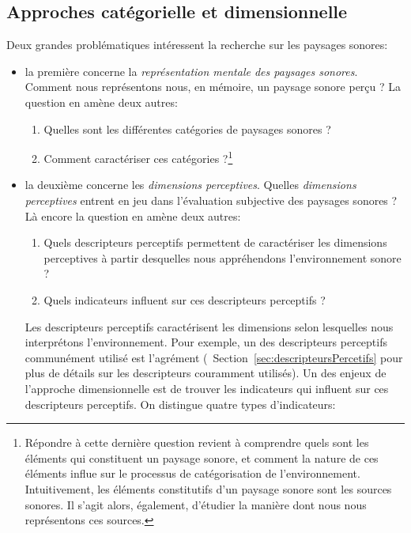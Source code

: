 \subsection{Approches catégorielle et dimensionnelle}
\label{sec:ch3_appCatDim}

Deux grandes problématiques intéressent la recherche sur les paysages sonores:

\begin{itemize}
\item la première concerne la \emph{représentation mentale des paysages sonores}. Comment nous représentons nous, en mémoire, un paysage sonore perçu ? La question en amène deux autres:

\begin{enumerate}
\item Quelles sont les différentes catégories de paysages sonores ?
\item Comment caractériser ces catégories ?\footnote{Répondre à cette dernière question revient à comprendre quels sont les éléments qui constituent un paysage sonore, et comment la nature de ces éléments influe sur le processus de catégorisation de l'environnement. Intuitivement, les éléments constitutifs d'un paysage sonore sont les sources sonores. Il s'agit alors, également, d'étudier la manière dont nous nous représentons ces sources.}
\end{enumerate}

\item la deuxième concerne les \emph{dimensions perceptives}. Quelles \emph{dimensions perceptives} entrent en jeu dans l'évaluation subjective des paysages sonores ? Là encore la question en amène deux autres:
\begin{enumerate}
\item Quels descripteurs perceptifs permettent de caractériser les dimensions perceptives à partir desquelles nous appréhendons l'environnement sonore ?
\item Quels indicateurs influent sur ces descripteurs perceptifs ?
\end{enumerate}

Les descripteurs perceptifs caractérisent les dimensions selon lesquelles nous interprétons l'environnement. Pour exemple, un des descripteurs perceptifs communément utilisé est l'agrément (\cf~Section~\ref{sec:descripteursPercetifs} pour plus de détails sur les descripteurs couramment utilisés). 
Un des enjeux de l'approche dimensionnelle est de trouver les indicateurs qui influent sur ces descripteurs perceptifs. On distingue quatre types d'indicateurs:


\end{itemize}
